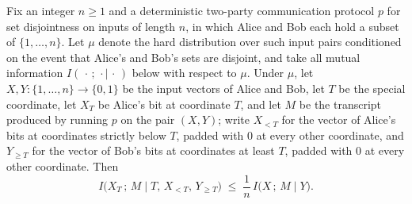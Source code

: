 \begin{theorem}
\label{CommunicationComplexity.Functions.Disjointness.RandomizedLowerBound.aliceInfoTerm_le_average_xVector_info}
\leanok
{}
Fix an integer $n \ge 1$ and a deterministic two-party communication protocol $p$ for
set disjointness on inputs of length $n$, in which Alice and Bob each hold a subset of
$\{1,\dots,n\}$. Let $\mu$ denote the hard distribution over such input pairs
conditioned on the event that Alice's and Bob's sets are disjoint, and take all mutual
information $I(\,\cdot\,;\,\cdot\mid\,\cdot\,)$ below with respect to $\mu$. Under
$\mu$, let $X, Y \colon \{1,\dots,n\} \to \{0,1\}$ be the input vectors of Alice and
Bob, let $T$ be the special coordinate, let $X_T$ be Alice's bit at coordinate $T$, and
let $M$ be the transcript produced by running $p$ on the pair $(X,Y)$; write $X_{<T}$
for the vector of Alice's bits at coordinates strictly below $T$, padded with $0$ at
every other coordinate, and $Y_{\ge T}$ for the vector of Bob's bits at coordinates at
least $T$, padded with $0$ at every other coordinate. Then
\[
I\big(X_T \,;\, M \mid T,\, X_{<T},\, Y_{\ge T}\big) \;\le\; \frac{1}{n}\, I\big(X \,;\,
M \mid Y\big).
\]
\end{theorem}

